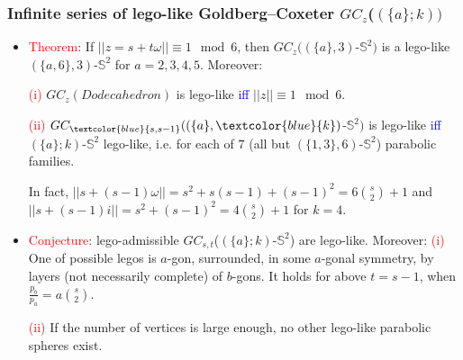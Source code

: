 \documentclass{beamer}
\begin{document}
\begin{frame}\frametitle{
Infinite series of 
 lego-like Goldberg--Coxeter  $GC_{z}$($(\{a\};k))$}
\begin{itemize}


\item \textcolor{red}{Theorem}: If $||z=s+t\omega||\equiv 1\mod 6$, then 
$GC_z((\{a\}, 3)$-$\mathbb{S}^2)$ is a lego-like $(\{a,6\}, 3)$-$\mathbb{S}^2$ for $a=2,3,4,5$. Moreover:

\textcolor{red}{(i)} $GC_z(Dodecahedron)$ is  lego-like 
\textcolor{blue}{iff} $||z||\equiv 1\mod 6$.

\textcolor{red}{(ii)}  $GC_{\textcolor{blue}{s,s-1}}((\{a\}, \textcolor{blue}{k})$-$\mathbb{S}^2)$ is  lego-like  
\textcolor{blue}{iff} 
 $(\{a\}; k)$-$\mathbb{S}^2$   lego-like,
  i.e.
for each of $7$ (all but  $(\{1,3\}, 6)$-$\mathbb{S}^2$) parabolic families.  
  

 In fact, 
$||s+(s-1)\omega||=s^2+s(s-1)+(s-1)^2=6{s\choose 2}+1$ and 
$||s+(s-1)i||=s^2+(s-1)^2=4{s\choose 2}+1$ for $k=4$.

\item
\textcolor{red}{Conjecture}:  lego-admissible  $GC_{s,t}$($(\{a\};k)$-$\mathbb{S}^2$) are lego-like.
Moreover: \textcolor{red}{(i)} 
One of possible legos 
is $a$-gon, surrounded, in some $a$-gonal symmetry,  by layers (not necessarily complete) of $b$-gons. 
It holds for above $t=s-1$, when  
$\frac{p_b}{p_a}=a{s\choose 2}$.

\textcolor{red}{(ii)}  If the number of vertices is large enough, 
no other lego-like parabolic spheres 
 exist.


\end{itemize}
\end{frame}
\end{document}
